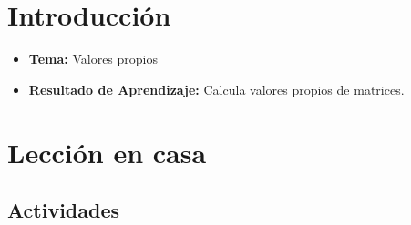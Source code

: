 \documentclass[a4,11pt]{aleph-notas}
\begin{document}
\encabezado


\section*{Introducción}

\begin{itemize}
    \item \textbf{Tema:} Valores propios
    \item \textbf{Resultado de Aprendizaje:} Calcula valores propios de matrices.
\end{itemize}

\section*{Lección en casa}

\subsection*{Actividades}
\end{document}

